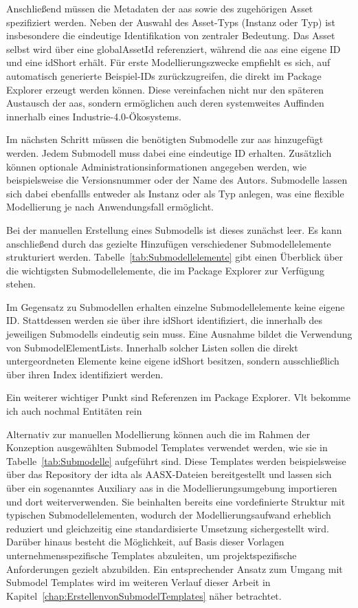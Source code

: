 Anschließend müssen die Metadaten der \acs{aas} sowie des zugehörigen Asset spezifiziert werden.
Neben der Auswahl des Asset-Typs (Instanz oder Typ) ist insbesondere die eindeutige Identifikation von zentraler Bedeutung.
Das Asset selbst wird über eine globalAssetId referenziert, während die \acs{aas} eine eigene ID und eine idShort erhält.
Für erste Modellierungszwecke empfiehlt es sich, auf automatisch generierte Beispiel-IDs zurückzugreifen, die direkt im Package Explorer erzeugt werden können.
Diese vereinfachen nicht nur den späteren Austausch der \acs{aas}, sondern ermöglichen auch deren systemweites Auffinden innerhalb eines Industrie-4.0-Ökosystems.

Im nächsten Schritt müssen die benötigten Submodelle zur \acs{aas} hinzugefügt werden.
Jedem Submodell muss dabei eine eindeutige ID erhalten.
Zusätzlich können optionale Administrationsinformationen angegeben werden, wie beispielsweise die Versionsnummer oder der Name des Autors.
Submodelle lassen sich dabei ebenfallls entweder als Instanz oder als Typ anlegen, was eine flexible Modellierung je nach Anwendungsfall ermöglicht.

Bei der manuellen Erstellung eines Submodells ist dieses zunächst leer.
Es kann anschließend durch das gezielte Hinzufügen verschiedener Submodellelemente strukturiert werden.
Tabelle~\ref{tab:Submodellelemente} gibt einen Überblick über die wichtigsten Submodellelemente, die im Package Explorer zur Verfügung stehen.



Im Gegensatz zu Submodellen erhalten einzelne Submodellelemente keine eigene ID.
Stattdessen werden sie über ihre idShort identifiziert, die innerhalb des jeweiligen Submodells eindeutig sein muss.
Eine Ausnahme bildet die Verwendung von SubmodelElementLists.
Innerhalb solcher Listen sollen die direkt untergeordneten Elemente keine eigene idShort besitzen, sondern ausschließlich über ihren Index identifiziert werden.

Ein weiterer wichtiger Punkt sind Referenzen im Package Explorer.
Vlt bekomme ich auch nochmal Entitäten rein

Alternativ zur manuellen Modellierung können auch die im Rahmen der Konzeption ausgewählten Submodel Templates verwendet werden, wie sie in Tabelle~\ref{tab:Submodelle} aufgeführt sind. 
Diese Templates werden beispielsweise über das Repository der \acs{idta} \cite{idtaTemplates} als AASX-Dateien bereitgestellt und lassen sich über ein sogenanntes Auxiliary \acs{aas} in die Modellierungsumgebung importieren und dort weiterverwenden. 
Sie beinhalten bereits eine vordefinierte Struktur mit typischen Submodellelementen, wodurch der Modellierungsaufwand erheblich reduziert und gleichzeitig eine standardisierte Umsetzung sichergestellt wird. 
Darüber hinaus besteht die Möglichkeit, auf Basis dieser Vorlagen unternehmensspezifische Templates abzuleiten, um projektspezifische Anforderungen gezielt abzubilden. 
Ein entsprechender Ansatz zum Umgang mit Submodel Templates wird im weiteren Verlauf dieser Arbeit in Kapitel~\ref{chap:ErstellenvonSubmodelTemplates} näher betrachtet.

